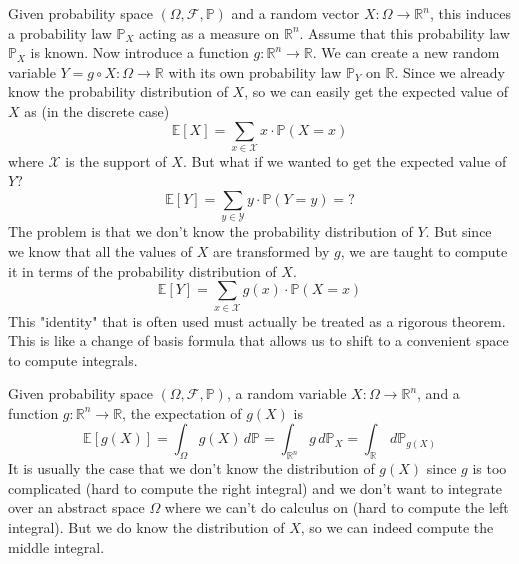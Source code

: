 \documentclass{article}
\begin{document}
      Given probability space $(\Omega, \mathcal{F}, \mathbb{P})$ and a random vector $X: \Omega \rightarrow \mathbb{R}^n$, this induces a probability law $\mathbb{P}_X$ acting as a measure on $\mathbb{R}^n$. Assume that this probability law $\mathbb{P}_X$ is known. Now introduce a function $g: \mathbb{R}^n \rightarrow \mathbb{R}$. We can create a new random variable $Y = g \circ X : \Omega \rightarrow \mathbb{R}$ with its own probability law $\mathbb{P}_Y$ on $\mathbb{R}$. Since we already know the probability distribution of $X$, so we can easily get the expected value of $X$ as (in the discrete case) 
      \begin{equation}
        \mathbb{E}[X] = \sum_{x \in \mathcal{X}} x \cdot \mathbb{P}(X = x)
      \end{equation}
      where $\mathcal{X}$ is the support of $X$. But what if we wanted to get the expected value of $Y$? 
      \begin{equation}
        \mathbb{E}[Y] = \sum_{y \in \mathcal{Y}} y \cdot \mathbb{P}(Y = y) = ?
      \end{equation}
      The problem is that we don't know the probability distribution of $Y$. But since we know that all the values of $X$ are transformed by $g$, we are taught to compute it in terms of the probability distribution of $X$. 
      \begin{equation}
        \mathbb{E}[Y] = \sum_{x \in \mathcal{X}} g(x) \cdot \mathbb{P}(X = x)
      \end{equation}
      This "identity" that is often used must actually be treated as a rigorous theorem. This is like a change of basis formula that allows us to shift to a convenient space to compute integrals. 

      \begin{theorem}[LOTUS]
        Given probability space $(\Omega, \mathcal{F}, \mathbb{P})$, a random variable $X: \Omega \rightarrow \mathbb{R}^n$, and a function $g: \mathbb{R}^n \rightarrow \mathbb{R}$, the expectation of $g(X)$ is 
        \begin{equation}
          \mathbb{E}[g(X)] = \int_\Omega g(X) \,d\mathbb{P} = \int_{\mathbb{R}^n} g \, d\mathbb{P}_X = \int_\mathbb{R} \,d \mathbb{P}_{g(X)}
        \end{equation}
        It is usually the case that we don't know the distribution of $g(X)$ since $g$ is too complicated (hard to compute the right integral) and we don't want to integrate over an abstract space $\Omega$ where we can't do calculus on (hard to compute the left integral). But we do know the distribution of $X$, so we can indeed compute the middle integral. 
      \end{theorem}
\end{document}
